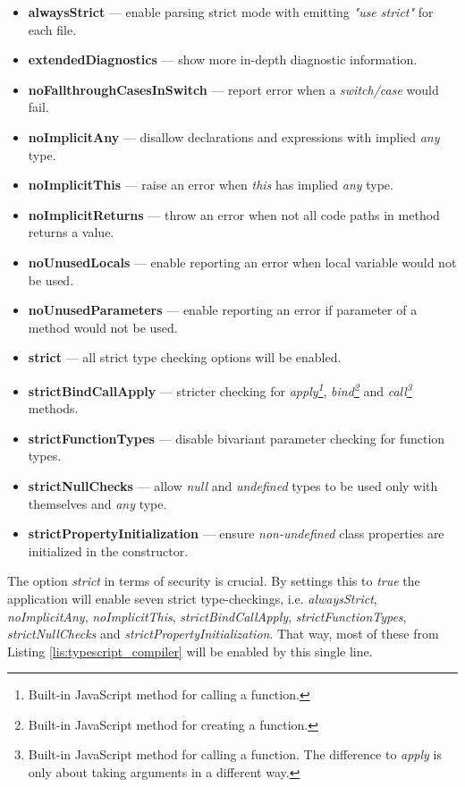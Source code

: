 \documentclass{article} %
\begin{document}
\begin{itemize}
    \item \textbf{alwaysStrict} --- enable parsing strict mode with emitting \textit{"use strict"} for each file.
    \item \textbf{extendedDiagnostics} --- show more in-depth diagnostic information.
    \item \textbf{noFallthroughCasesInSwitch} --- report error when a \textit{switch/case} would fail.
    \item \textbf{noImplicitAny} --- disallow declarations and expressions with implied \textit{any} type.
    \item \textbf{noImplicitThis} --- raise an error when \textit{this} has implied \textit{any} type.
    \item \textbf{noImplicitReturns} --- throw an error when not all code paths in method returns a value.
    \item \textbf{noUnusedLocals} --- enable reporting an error when local variable would not be used.
    \item \textbf{noUnusedParameters} --- enable reporting an error if parameter of a method would not be used.
    \item \textbf{strict} --- all strict type checking options will be enabled.
    \item \textbf{strictBindCallApply} --- stricter checking for \textit{apply\footnote{Built-in JavaScript method for calling a function.}}, \textit{bind\footnote{Built-in JavaScript method for creating a function.}} and \textit{call\footnote{Built-in JavaScript method for calling a function. The difference to \textit{apply} is only about taking arguments in a different way.}} methods.
    \item \textbf{strictFunctionTypes} --- disable bivariant parameter checking for function types. 
    \item \textbf{strictNullChecks} --- allow \textit{null} and \textit{undefined} types to be used only with themselves and \textit{any} type.
    \item \textbf{strictPropertyInitialization} --- ensure \textit{non-undefined} class properties are initialized in the constructor.
\end{itemize}
The option \textit{strict} in terms of security is crucial. By settings this to \textit{true} the application will enable seven strict type-checkings, i.e. \textit{alwaysStrict}, \textit{noImplicitAny}, \textit{noImplicitThis}, \textit{strictBindCallApply}, \textit{strictFunctionTypes}, \textit{strictNullChecks} and \textit{strictPropertyInitialization}. That way, most of these from Listing \ref{lis:typescript_compiler} will be enabled by this single line. \\
\end{document}
